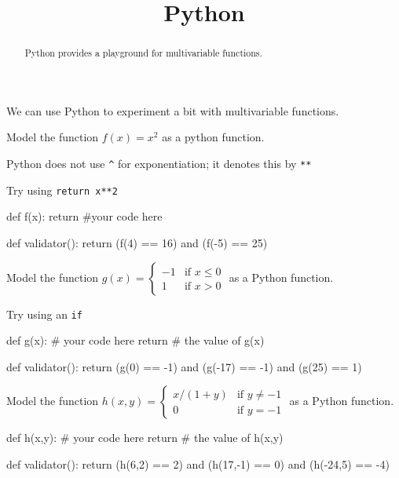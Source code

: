 \documentclass{ximera}
\title{Python}
\begin{document}
\begin{abstract}
  Python provides a playground for multivariable functions.
\end{abstract}

We can use Python to experiment a bit with multivariable functions.

\begin{question}
  \begin{solution}
    Model the function $f(x) = x^2$ as a python function.

    \begin{hint}
    \begin{warning}
      Python does not use \verb|^| for exponentiation; it denotes this by \verb|**|
    \end{warning}
    \end{hint}

    \begin{hint}
      Try using \verb|return x**2|
    \end{hint}
    \begin{python}
def f(x):
  return #your code here

def validator():
  return (f(4) == 16) and (f(-5) == 25)
    \end{python}
  \end{solution}

  \begin{solution}
    Model the function \(g(x)=\begin{cases} -1 & \text{if $x \leq 0$} \\ 1 & \text{if $x>0$}\end{cases}\) as a Python function.

    \begin{hint}
      Try using an \verb|if|
    \end{hint}

    \begin{python}
def g(x):
  # your code here
  return # the value of g(x)

def validator():
  return (g(0) == -1) and (g(-17) == -1) and (g(25) == 1)
    \end{python}
  \end{solution}


  \begin{solution}
Model the function \(h(x,y) = \begin{cases} x/(1+y) & \text{if $y \neq -1$} \\ 0 & \text{if $y = -1$}\end{cases}\) as a Python function.

    \begin{python}
def h(x,y):
  # your code here
  return # the value of h(x,y)

def validator():
  return (h(6,2) == 2) and (h(17,-1) == 0) and (h(-24,5) == -4)
    \end{python}
  \end{solution}
\end{question}
	
\end{document}

